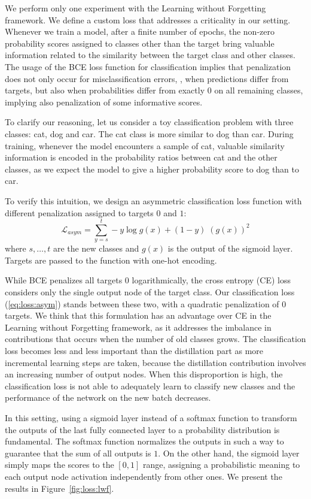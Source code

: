 \documentclass[10pt,twocolumn,letterpaper]{article}
\begin{document}
We perform only one experiment with the Learning without Forgetting framework. We define a custom loss that addresses a criticality in our setting. Whenever we train a model, after a finite number of epochs, the non-zero probability scores assigned to classes other than the target bring valuable information related to the similarity between the target class and other classes. The usage of the BCE loss function for classification implies that penalization does not only occur for misclassification errors, \ie, when predictions differ from targets, but also when probabilities differ from exactly $0$ on all remaining classes, implying also penalization of some informative scores.

To clarify our reasoning, let us consider a toy classification problem with three classes: cat, dog and car. The cat class is more similar to dog than car. During training, whenever the model encounters a sample of cat, valuable similarity information is encoded in the probability ratios between cat and the other classes, as we expect the model to give a higher probability score to dog than to car.

To verify this intuition, we design an asymmetric classification loss function with different penalization assigned to targets $0$ and $1$:
\begin{equation}
    \mathcal{L}_{asym}=\sum_{y=s}^{t} -y \log{g(x)} + (1-y)\;(g(x))^{2} \label{eq:loss:asym}
\end{equation}
where $s, \dots, t$ are the new classes and $g(x)$ is the output of the sigmoid layer. Targets are passed to the function with one-hot encoding.

While BCE penalizes all targets $0$ logarithmically, the cross entropy (CE) loss considers only the single output node of the target class. Our classification loss (\ref{eq:loss:asym}) stands between these two, with a quadratic penalization of $0$ targets. We think that this formulation has an advantage over CE in the Learning without Forgetting framework, as it addresses the imbalance in contributions that occurs when the number of old classes grows. The classification loss becomes less and less important than the distillation part as more incremental learning steps are taken, because the distillation contribution involves an increasing number of output nodes. When this disproportion is high, the classification loss is not able to adequately learn to classify new classes and the performance of the network on the new batch decreases.

In this setting, using a sigmoid layer instead of a softmax function to transform the outputs of the last fully connected layer to a probability distribution is fundamental. The softmax function normalizes the outputs in such a way to guarantee that the sum of all outputs is $1$. On the other hand, the sigmoid layer simply maps the scores to the $[0, 1]$ range, assigning a probabilistic meaning to each output node activation independently from other ones. We present the results in Figure~\ref{fig:loss:lwf}.
\end{document}
